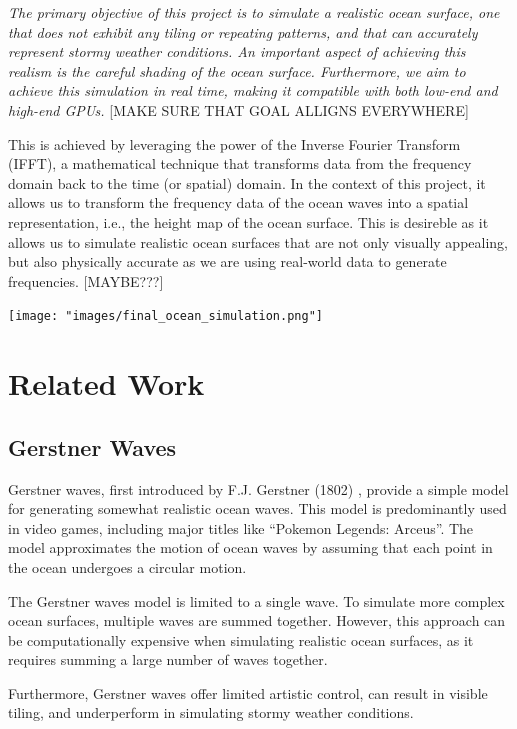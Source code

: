 \textit{The primary objective of this project is to simulate a realistic ocean surface, one that does not exhibit any tiling or repeating patterns, and that can accurately represent stormy weather conditions. An important aspect of achieving this realism is the careful shading of the ocean surface. Furthermore, we aim to achieve this simulation in real time, making it compatible with both low-end and high-end GPUs.} [MAKE SURE THAT GOAL ALLIGNS EVERYWHERE]

This is achieved by leveraging the power of the Inverse Fourier Transform (IFFT), a mathematical technique that transforms data 
from the frequency domain back to the time (or spatial) domain. In the context of this project, 
it allows us to transform the frequency data of the ocean waves into a spatial representation, i.e., the height map of the ocean surface. This is
desireble as it allows us to simulate realistic ocean surfaces that are not only visually appealing, but also physically accurate as 
we are using real-world data to generate frequencies. [MAYBE???]

\begin{minipage}{1\textwidth}
    \centering
    \texttt{[image: "images/final\_ocean\_simulation.png"]}
    \label{fig:ocean_simulation}
\end{minipage}

\section{Related Work}

\subsection{Gerstner Waves}
Gerstner waves, first introduced by F.J. Gerstner (1802) \cite{Franz1809}, provide a simple model for generating somewhat realistic ocean waves. This model is predominantly used in video games, including major titles like “Pokemon Legends: Arceus”. The model approximates the motion of ocean waves by assuming that each point in the ocean undergoes a circular motion. 

The Gerstner waves model is limited to a single wave. To simulate more complex ocean surfaces, multiple waves are summed together. However, this approach can be computationally expensive when simulating realistic ocean surfaces, as it requires summing a large number of waves together. 

Furthermore, Gerstner waves offer limited artistic control, can result in visible tiling, and underperform in simulating stormy weather conditions.

